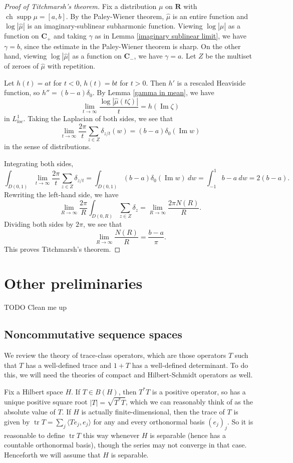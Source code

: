 \documentclass[12pt]{report}
\newcommand{\RR}{\mathbf{R}}
\newcommand{\CC}{\mathbf{C}}
\DeclareMathOperator{\ch}{ch}
\DeclareMathOperator{\supp}{supp}
\renewcommand{\Im}{\operatorname{Im}}
\newcommand{\tr}{\operatorname{tr}}
\theoremstyle{definition}
\begin{document}
\begin{proof}[Proof of Titchmarsh's theorem]
Fix a distribution $\mu$ on $\RR$ with $\ch \supp \mu = [a, b]$. By the Paley-Wiener theorem, $\hat \mu$ is an entire function and $\log |\hat \mu|$ is an imaginary-sublinear subharmonic function. Viewing $\log |\hat \mu|$ as a function on $\CC_+$ and taking $\gamma$ as in Lemma \ref{imaginary sublinear limit}, we have $\gamma = b$, since the estimate in the Paley-Wiener theorem is sharp. On the other hand, viewing $\log |\hat \mu|$ as a function on $\CC_-$, we have $\gamma = a$. Let $Z$ be the multiset of zeroes of $\hat \mu$ with repetition.

Let $h(t) = at$ for $t < 0$, $h(t) = bt$ for $t > 0$. Then $h'$ is a rescaled Heaviside function, so $h'' = (b-a)\delta_0$. By Lemma \ref{gamma in mean}, we have
$$\lim_{t \to \infty} \frac{\log |\hat \mu(t\zeta)|}{t} = h(\Im \zeta)$$
in $L^1_{loc}$. Taking the Laplacian of both sides, we see that
$$\lim_{t \to \infty} \frac{2\pi}{t} \sum_{z \in Z} \delta_{z/t}(w) = (b-a)\delta_0(\Im w)$$
in the sense of distributions.

Integrating both sides,
$$\int_{D(0, 1)} \lim_{t \to \infty} \frac{2\pi}{t} \sum_{z \in Z} \delta_{z/t} = \int_{D(0, 1)} (b-a)\delta_0(\Im w) ~dw = \int_{-1}^1 b - a ~dw = 2(b - a).$$
Rewriting the left-hand side, we have
$$\lim_{R \to \infty} \frac{2\pi }{R} \int_{D(0, R)} \sum_{z \in Z} \delta_z = \lim_{R \to \infty} \frac{2\pi N(R)}{R}.$$
Dividing both sides by $2\pi$, we see that
$$\lim_{R \to \infty} \frac{N(R)}{R} = \frac{b - a}{\pi}.$$
This proves Titchmarsh's theorem.
\end{proof}

\chapter{Other preliminaries}
TODO Clean me up


\section{Noncommutative sequence spaces}
We review the theory of trace-class operators, which are those operators $T$ such that $T$ has a well-defined trace and $1 + T$ has a well-defined determinant. To do this, we will need the theories of compact and Hilbert-Schmidt operators as well.

Fix a Hilbert space $H$. If $T \in B(H)$, then $T^*T$ is a positive operator, so has a unique positive square root $|T| = \sqrt{T^*T}$, which we can reasonably think of as the absolute value of $T$. If $H$ is actually finite-dimensional, then the trace of $T$ is given by $\tr T = \sum_j \langle Te_j, e_j\rangle$ for any and every orthonormal basis $(e_j)_j$. So it is reasonable to define $\tr T$ this way whenever $H$ is separable (hence has a countable orthonormal basis), though the series may not converge in that case. Henceforth we will assume that $H$ is separable.
\end{document}
